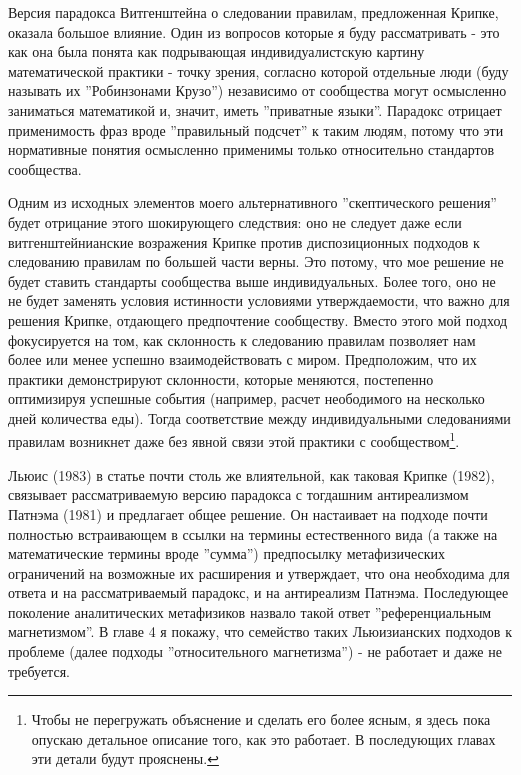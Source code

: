 \documentclass{book}
\begin{document}
Версия парадокса Витгенштейна о следовании правилам, предложенная Крипке, оказала большое влияние. Один из вопросов которые я буду рассматривать - это как она была понята как подрывающая индивидуалистскую картину математической практики - точку зрения, согласно которой отдельные люди (буду называть их ''Робинзонами Крузо'') независимо от сообщества могут осмысленно заниматься математикой и, значит, иметь ''приватные языки''. Парадокс отрицает применимость фраз вроде ''правильный подсчет'' к таким людям, потому что эти нормативные понятия осмысленно применимы только относительно стандартов сообщества.

Одним из исходных элементов моего альтернативного ''скептического решения'' будет отрицание этого шокирующего следствия: оно не следует даже если витгенштейнианские возражения Крипке против диспозиционных подходов к следованию правилам по большей части верны. Это потому, что мое решение не будет ставить стандарты сообщества выше индивидуальных. Более того, оно не не будет заменять условия истинности условиями утверждаемости, что важно для решения Крипке, отдающего предпочтение сообществу. Вместо этого мой подход фокусируется на том, как склонность к следованию правилам позволяет нам более или менее успешно взаимодействовать с миром. Предположим, что их практики демонстрируют склонности, которые меняются, постепенно оптимизируя успешные события (например, расчет неободимого на несколько дней количества еды). Тогда соответствие между индивидуальными следованиями правилам возникнет даже без явной связи этой практики с сообществом\footnote{Чтобы не перегружать объяснение и сделать его более ясным, я здесь пока опускаю детальное описание того, как это работает. В последующих главах эти детали будут прояснены.}.

Льюис (1983) в статье почти столь же влиятельной, как таковая Крипке (1982), связывает рассматриваемую версию парадокса с тогдашним антиреализмом Патнэма (1981) и предлагает общее решение. Он настаивает на подходе почти полностью встраивающем в ссылки на термины естественного вида (а также на математические термины вроде ''сумма'') предпосылку метафизических ограничений на возможные их расширения и утверждает, что она необходима для ответа и на рассматриваемый парадокс, и на антиреализм Патнэма. Последующее поколение аналитических метафизиков назвало такой ответ ''референциальным магнетизмом''. В главе 4 я покажу, что семейство таких Льюизианских подходов к проблеме (далее подходы ''относительного магнетизма'') - не работает и даже не требуется.
\end{document}
